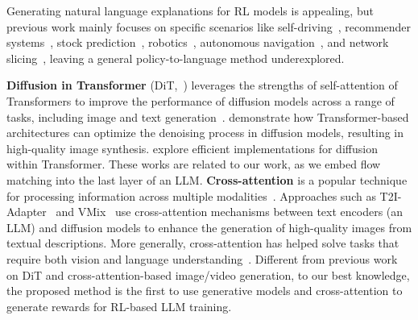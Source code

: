 Generating natural language explanations for RL models is appealing, but previous work mainly focuses on specific scenarios like self-driving~\cite{cai2024driving}, recommender systems~\cite{lubos2024llm}, stock prediction~\cite{koa2024learning}, robotics~\cite{lu2023closer}, autonomous navigation~\cite{trigg2024natural}, and network slicing~\cite{ameur2024leveraging}, leaving a general policy-to-language method underexplored. 

\textbf{Diffusion in Transformer} (DiT,~\citet{yang2023diffusion}) leverages the strengths of self-attention of Transformers to improve the performance of diffusion models across a range of tasks, including image and text generation~\cite{cao2024survey}. \citet{dhariwal2021diffusion} demonstrate how Transformer-based architectures can optimize the denoising process in diffusion models, resulting in high-quality image synthesis. \citet{ulhaq2022efficient} explore efficient implementations for diffusion within Transformer. These works are related to our work, as we embed flow matching into the last layer of an LLM. \textbf{Cross-attention} is a popular technique for processing information across multiple modalities~\citep{radford2021learning, alayrac2022flamingo, li2023blip}. Approaches such as T2I-Adapter~\citep{mou2024t2i} and VMix~\citep{wu2024vmix} use cross-attention mechanisms between text encoders (an LLM) and diffusion models to enhance the generation of high-quality images from textual descriptions. More generally, cross-attention has helped solve tasks that require both vision and language understanding~\citep{hatamizadeh2025diffit, cao2024survey}.  Different from previous work on DiT and cross-attention-based image/video generation, to our best knowledge, the proposed method is the first to use generative models and cross-attention to generate rewards for RL-based LLM training.

